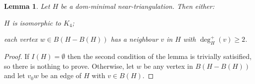 \documentclass[12pt]{article}
\newtheorem{lem}{Lemma}
\theoremstyle{definition}
\begin{document}
\begin{lem}\label{degree_2_outer_neighbour}
  Let $H$ be a dom-minimal near-triangulation. Then either:
  \begin{compactenum}
    \item $H$ is isomorphic to $K_4$;
    \item each vertex $w\in B(H-B(H))$ has a neighbour $v$ in $H$ with $\deg^+_H(v)\ge 2$.
  \end{compactenum}
\end{lem}

\begin{proof}
  If $I(H)=\emptyset$ then the second condition of the lemma is trivially satisified, so there is nothing to prove. Otherwise, let $w$ be any vertex in $B(H-B(H))$ and let $v_0w$ be an edge of $H$ with $v\in B(H)$.



\end{proof}
\end{document}
